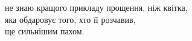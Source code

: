 не знаю кращого прикладу прощення, ніж квітка,\\
яка обдаровує того, хто її розчавив,\\
ще сильнішим пахом.\\
